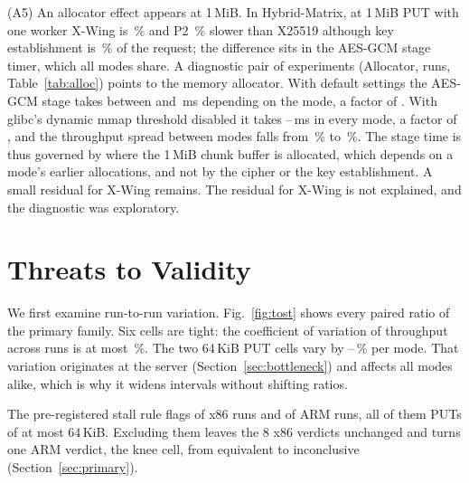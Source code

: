 \documentclass[review,12pt]{elsarticle}
\newcommand{\lab}[1]{\textsf{#1}}
\begin{document}
(A5) An allocator effect appears at 1\,MiB. In \lab{Hybrid-Matrix}, at 1\,MiB PUT with one worker X-Wing is
\RevMidPutXwingDeficit\,\% and P2 \RevMidPutStudyHybridDeficit\,\% slower than X25519 although key
establishment is \RevKeShareXwingMidPut\,\% of the request; the difference sits in the AES-GCM
stage timer, which all modes share. A diagnostic pair of experiments (\lab{Allocator}, \AudAllocRuns{} runs,
Table~\ref{tab:alloc}) points to the memory allocator. With default settings the AES-GCM stage
takes between \AudAllocDefaultLo{} and \AudAllocDefaultHi\,ms depending on the mode, a factor of
\AudAllocDefaultSpread. With glibc's dynamic mmap threshold disabled it takes
\AudAllocFixedLo--\AudAllocFixedHi\,ms in every mode, a factor of \AudAllocFixedSpread, and the
throughput spread between modes falls from \AudAllocDefaultThrSpread\,\% to
\AudAllocFixedThrSpread\,\%. The stage time is thus governed by where the 1\,MiB chunk buffer is
allocated, which depends on a mode's earlier allocations, and not by the cipher or the key
establishment. A small residual for X-Wing remains.
The residual for X-Wing is not explained, and the diagnostic was exploratory.

\begin{table}[!htbp]
\caption{1\,MiB PUT, one worker: AES-GCM stage time and throughput with the default allocator and with glibc's mmap threshold fixed at 256\,MiB (\lab{Allocator}, five runs each)}
\label{tab:alloc}
\centering\footnotesize
{}
\end{table}

\section{Threats to Validity}\label{sec:validity}\label{sec:pending}
We first examine run-to-run variation.
Fig.~\ref{fig:tost} shows every paired ratio of the primary family. Six cells are tight: the
coefficient of variation of throughput across runs is at most \RevCvQuietMax\,\%. The two
64\,KiB PUT cells vary by \RevCvNoisyLo--\RevCvNoisyHi\,\% per mode. That variation originates at
the server (Section~\ref{sec:bottleneck}) and affects all modes alike, which is why it widens
intervals without shifting ratios.

The pre-registered stall rule flags \RevStalls{} of \RevRuns{} x86 runs and \ArmStalls{} of \ArmRuns{}
ARM runs, all of them PUTs of at most 64\,KiB. Excluding them leaves the 8 x86 verdicts
unchanged and turns one ARM verdict, the knee cell, from equivalent to inconclusive
(Section~\ref{sec:primary}).
\end{document}
